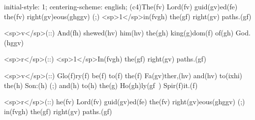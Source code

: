 initial-style: 1;
centering-scheme: english;
(c4)The(fv) Lord(fv) guid(gv)ed(fe) the(fv) right(gv)eous(ghggv) (;) <sp>1</sp>in(fvgh) the(gf) right(gv) paths.(gf)

<sp>v</sp>(::) And(fh) shewed(hv) him(hv) the(gh) king(g)dom(f) of(gh) God.(hggv)

<sp>r</sp>(::) <sp>1</sp>In(fvgh) the(gf) right(gv) paths.(gf)

<sp>v</sp>(::) Glo(f)ry(f) be(f) to(f) the(f) Fa(gv)ther,(hv) and(hv) to(ixhi) the(h) Son:(h) (;) and(h) to(h) the(g) Ho(gh)ly(gf~) Spir(f)it.(f)

<sp>r</sp>(::) he(fv) Lord(fv) guid(gv)ed(fe) the(fv) right(gv)eous(ghggv) (;) in(fvgh) the(gf) right(gv) paths.(gf)
